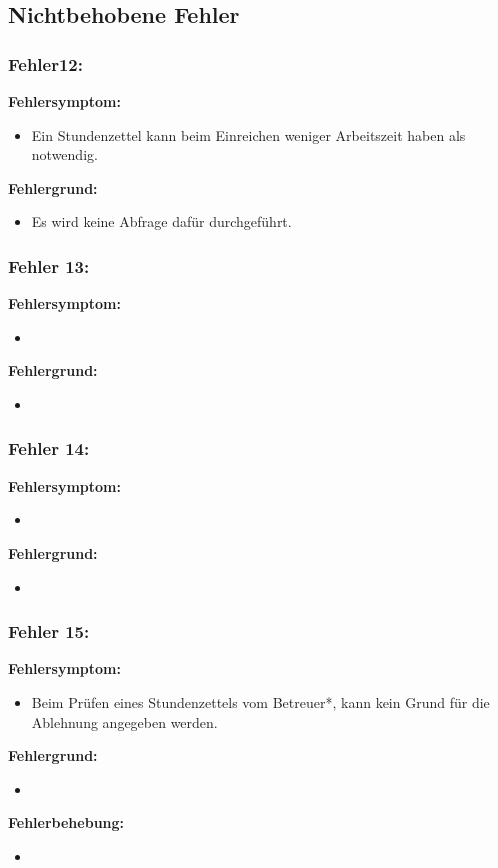 \newpage

\subsection{Nichtbehobene Fehler}

\subsubsection{Fehler12:}%
\textbf{Fehlersymptom:}
	\begin{itemize}
		\item Ein Stundenzettel kann beim Einreichen weniger Arbeitszeit haben als notwendig.
	\end{itemize}
\textbf{Fehlergrund:}
	\begin{itemize}
		\item Es wird keine Abfrage dafür durchgeführt.
	\end{itemize}
	
\subsubsection{Fehler 13:}%
\textbf{Fehlersymptom:}
	\begin{itemize}
		\item 
	\end{itemize}
\textbf{Fehlergrund:}
	\begin{itemize}
		\item 
	\end{itemize}
	
\subsubsection{Fehler 14:}%
\textbf{Fehlersymptom:}
	\begin{itemize}
		\item 
	\end{itemize}
\textbf{Fehlergrund:}
	\begin{itemize}
		\item 
	\end{itemize}
	
\subsubsection{Fehler 15:}%
\textbf{Fehlersymptom:}
	\begin{itemize}
		\item Beim Prüfen eines Stundenzettels vom Betreuer*, kann kein Grund für die Ablehnung angegeben werden.
	\end{itemize}
\textbf{Fehlergrund:}
	\begin{itemize}
		\item 
	\end{itemize}
\textbf{Fehlerbehebung:}
	\begin{itemize}
		\item 
	\end{itemize}

